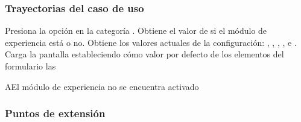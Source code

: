 \subsubsection{Trayectorias del caso de uso}

\begin{UCtrayectoria}%
   
  \Actor Presiona la opción {\bf {}} en la categoría
         .
  \Sistema Obtiene el valor de si el módulo de experiencia está  o no. 
  \Sistema Obtiene los valores actuales de la configuración:
           ,
           ,
           ,
           ,
            e
           .
  \Sistema Carga la pantalla  estableciendo cómo valor por defecto
           de los elementos del formulario las 

\end{UCtrayectoria}

\begin{UCtrayectoriaA}{A}{El módulo de experiencia no se encuentra activado}
\end{UCtrayectoriaA}

\subsubsection{Puntos de extensión}


